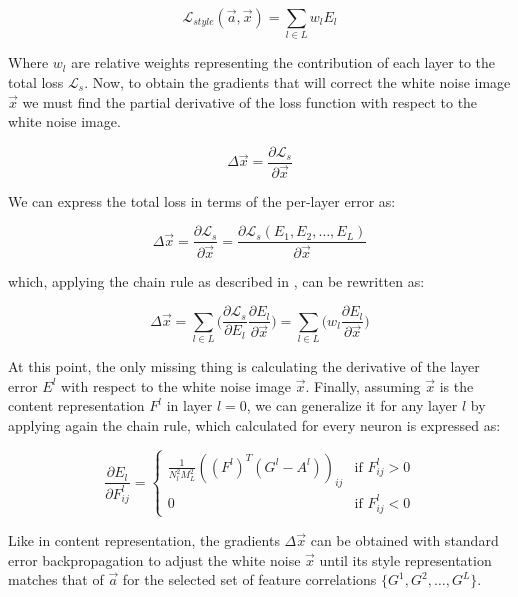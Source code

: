\begin{equation}
  \mathcal{L}_{style}(\vec{a}, \vec{x}) =
  \sum_{l \in L} w_l E_l
\end{equation}

Where $w_l$ are relative weights representing the contribution of each layer to the total loss $\mathcal{L}_{s}$.
Now, to obtain the gradients that will correct the white noise image $\vec{x}$ we must find the partial derivative of the loss function with respect to the white noise image.

\begin{equation}
  \Delta \vec{x} =
  \frac{\partial \mathcal{L}_{s}}{\partial \vec{x}}
\end{equation}

We can express the total loss in terms of the per-layer error as:

\begin{equation}
  \Delta \vec{x} =
  \frac{\partial \mathcal{L}_{s}}{\partial \vec{x}} =
  \frac{\partial \mathcal{L}_{s}(E_1, E_2, \dots, E_L)}{\partial \vec{x}}
\end{equation}

which, applying the chain rule as described in \cite[Eq. 3.23]{Hairer2008}, can be rewritten as:

\begin{equation}
  \Delta \vec{x} =
  \sum_{l \in L} \Bigg(\frac{\partial \mathcal{L}_s}{\partial E_l} \frac{\partial E_l}{\partial \vec{x}}\Bigg) =
  \sum_{l \in L} \Bigg(w_l \frac{\partial E_l}{\partial \vec{x}}\Bigg)
\end{equation}

At this point, the only missing thing is calculating the derivative of the layer error $E^l$ with respect to the white noise image $\vec{x}$.
Finally, assuming $\vec{x}$ is the content representation $F^l$ in layer $l = 0$, we can generalize it for any layer $l$ by applying again the chain rule, which calculated for every neuron is expressed as:

\begin{equation}
  \frac{\partial E_l}{\partial F^l_{ij}} =
  \begin{cases}
    \frac{1}{N^2_l M^2_L} ((F^l)^T (G^l - A^l))_{ij} & \text{if } F^l_{ij} > 0 \\
    0                                                & \text{if } F^l_{ij} < 0
  \end{cases}
\end{equation}

Like in content representation, the gradients $\Delta \vec{x}$ can be obtained with standard error backpropagation to adjust the white noise $\vec{x}$ until its style representation matches that of $\vec{a}$ for the selected set of feature correlations $\{G^1, G^2, \dots, G^L\}$.

